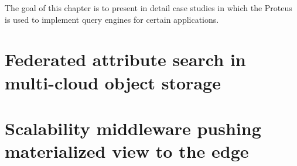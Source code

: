 The goal of this chapter is to present in detail case studies in which the
Proteus is used to implement query engines for certain applications.

\section{Federated attribute search in multi-cloud object storage}

\section{Scalability middleware pushing materialized view to the edge}